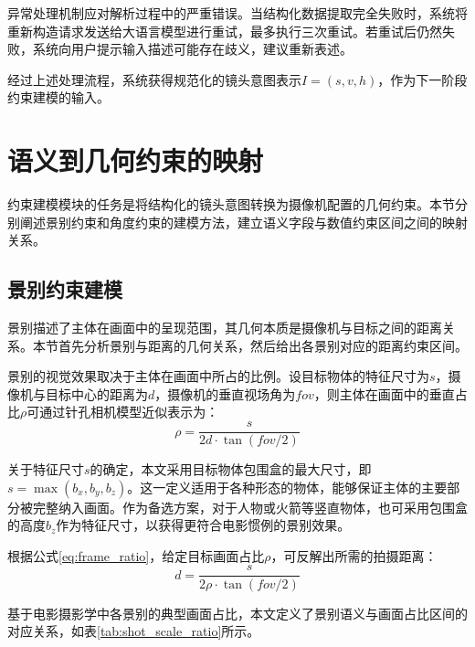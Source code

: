 异常处理机制应对解析过程中的严重错误。当结构化数据提取完全失败时，系统将重新构造请求发送给大语言模型进行重试，最多执行三次重试。若重试后仍然失败，系统向用户提示输入描述可能存在歧义，建议重新表述。

经过上述处理流程，系统获得规范化的镜头意图表示$I = (s, v, h)$，作为下一阶段约束建模的输入。

\section{语义到几何约束的映射}

约束建模模块的任务是将结构化的镜头意图转换为摄像机配置的几何约束。本节分别阐述景别约束和角度约束的建模方法，建立语义字段与数值约束区间之间的映射关系。

\subsection{景别约束建模}

景别描述了主体在画面中的呈现范围，其几何本质是摄像机与目标之间的距离关系。本节首先分析景别与距离的几何关系，然后给出各景别对应的距离约束区间。

景别的视觉效果取决于主体在画面中所占的比例。设目标物体的特征尺寸为$s$，摄像机与目标中心的距离为$d$，摄像机的垂直视场角为$\textit{fov}$，则主体在画面中的垂直占比$\rho$可通过针孔相机模型近似表示为：
\begin{equation}
\rho = \frac{s}{2d \cdot \tan(\textit{fov}/2)}
\label{eq:frame_ratio}
\end{equation}

关于特征尺寸$s$的确定，本文采用目标物体包围盒的最大尺寸，即$s = \max(b_x, b_y, b_z)$。这一定义适用于各种形态的物体，能够保证主体的主要部分被完整纳入画面。作为备选方案，对于人物或火箭等竖直物体，也可采用包围盒的高度$b_z$作为特征尺寸，以获得更符合电影惯例的景别效果。

根据公式\ref{eq:frame_ratio}，给定目标画面占比$\rho$，可反解出所需的拍摄距离：
\begin{equation}
d = \frac{s}{2\rho \cdot \tan(\textit{fov}/2)}
\label{eq:distance_calc}
\end{equation}

基于电影摄影学中各景别的典型画面占比\cite{arijon1976grammar}，本文定义了景别语义与画面占比区间的对应关系，如表\ref{tab:shot_scale_ratio}所示。

